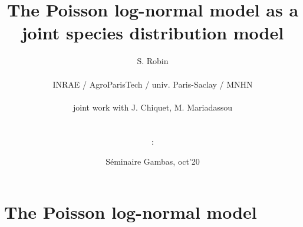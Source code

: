 \documentclass[8pt]{beamer}
\begin{document}
\title[PLN as a JSDM]{The Poisson log-normal model as a joint species distribution model}

\author[S. Robin]{S. Robin \\ ~\\
  {\small INRAE / AgroParisTech / univ. Paris-Saclay / MNHN} \\ ~\\
  joint work with J. Chiquet, M. Mariadassou \\ ~\\ ~\\
  : }

\date{S\'eminaire Gambas, oct'20}

\maketitle


\section{The Poisson log-normal model}
\end{document}
